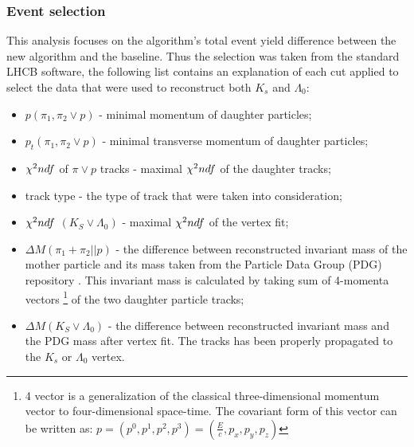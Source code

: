 \subsubsection{Event selection}

This analysis focuses on the algorithm's total event yield difference between the new algorithm and the baseline. Thus the selection was taken from the standard LHCB software, the following list contains an explanation of each cut applied to select the data that were used to reconstruct both $K_s$ and $\Lambda_{0}$:

\begin{itemize}
    \item \textbf{$p(\pi_1, \pi_2 \lor p)$} - minimal momentum of daughter particles;
    \item \textbf{$p_t(\pi_1, \pi_2 \lor p)$} - minimal transverse momentum of daughter particles;
    \item $\chi^2\/ndf$ of $\pi \lor p$ tracks - maximal  $\chi^2\/ndf$ of the daughter tracks;
    \item track type - the type of track that were taken into consideration;
    \item $\chi^2\/ndf$ $(K_S \lor \Lambda_0)$ - maximal $\chi^2\/ndf$ of the vertex fit;
    \item $\Delta M(\pi_1 + \pi_2 || p)$ - the difference between reconstructed invariant mass of the mother particle and its mass taken from the Particle Data Group (PDG) repository \cite{PDG}. This invariant mass is calculated by taking sum of 4-momenta vectors \footnote{4 vector is a generalization of the classical three-dimensional momentum vector to four-dimensional space-time. The covariant form of this vector can be written as: $p= (p^{0}, p^{1}, p^{2}, p^{3}) = (\frac{E}{c},p_x,p_y,p_z) $ }  of the two daughter particle tracks;   
    \item $\Delta M(K_S \lor \Lambda_0)$ -  the difference between reconstructed invariant mass and the PDG mass after vertex fit. The tracks has been properly propagated to the $K_s$ or $\Lambda_0$  vertex. 
\end{itemize}

